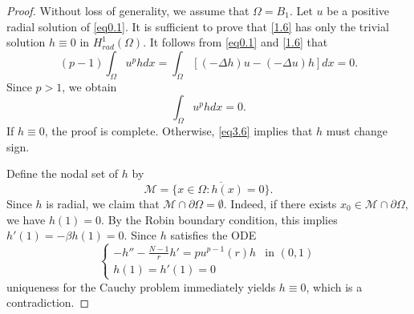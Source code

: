 \documentclass[12pt,reqno]{amsart}
\numberwithin{equation}{section}
\theoremstyle{definition}
\begin{document}
\begin{proof}
Without loss of generality, we assume that $\Omega=B_1$. Let $u$ be a positive radial solution of \eqref{eq0.1}. It is sufficient to prove that \eqref{1.6} has only the trivial solution $h\equiv0$ in $H^1_{rad}(\Omega)$. It follows from \eqref{eq0.1} and \eqref{1.6} that 
$$
(p-1)\int_{\Omega}u^phdx=\int_{\Omega}[(-\Delta h)u-(-\Delta u)h]dx=0.
$$
Since $p>1$, we obtain 
\begin{equation}\label{eq3.6}
\int_{\Omega}u^phdx=0.
\end{equation}
If $h\equiv 0$, the proof is complete. Otherwise, \eqref{eq3.6} implies that $h$ must change sign. 

Define the nodal set of $h$ by
$$
\mathcal{M}=\overline{\{x\in\Omega : h(x)=0\}}.
$$
% 
Since $h$ is radial, we claim that $\mathcal{M}\cap \partial\Omega=\emptyset$. Indeed, if there exists $x_0 \in \mathcal{M} \cap \partial\Omega$, we have $h(1)=0$. By the Robin boundary condition, this implies $h'(1)=-\beta h(1)=0$. Since $h$ satisfies the ODE
$$\begin{cases}
-h''-\frac{N-1}rh'=pu^{p-1}(r)h&\text{in }(0,1)\\
h(1)=h'(1)=0
\end{cases}
$$
uniqueness for the Cauchy problem immediately yields $h \equiv 0$, which is a contradiction.
 



\end{proof}
\end{document}
